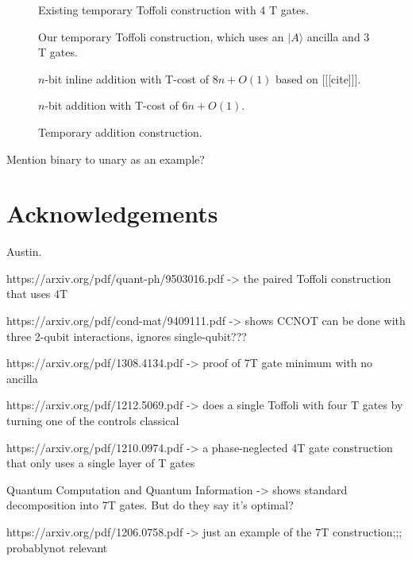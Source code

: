 \documentclass[twocolumn,longbibliography]{quantumarticle-customized}
\begin{document}
\begin{figure}
  \centering
  \makebox[\linewidth]{
  }
  \caption{
	Existing temporary Toffoli construction with 4 T gates.
  }
  \label{fig:inline-temporary-toffoli}
\end{figure}

\begin{figure}
  \centering
  \makebox[\linewidth]{
  }
  \caption{
	Our temporary Toffoli construction, which uses an $|A\rangle$ ancilla and 3 T gates.
  }
  \label{fig:ancilla-temporary-toffoli}
\end{figure}

\begin{figure}
  \centering
  \makebox[\linewidth]{
  }
  \caption{
	$n$-bit inline addition with T-cost of $8n + O(1)$ based on [[[cite]]].
  }
  \label{fig:inline-addition}
\end{figure}

\begin{figure}
  \centering
  \makebox[\linewidth]{
  }
  \caption{
	$n$-bit addition with T-cost of $6n + O(1)$.
  }
  \label{fig:ancilla-addition}
\end{figure}

\begin{figure}
  \centering
  \makebox[\linewidth]{
  }
  \caption{
	Temporary addition construction.
  }
  \label{fig:temporary-ancilla-addition}
\end{figure}

Mention binary to unary as an example?





\section{Acknowledgements}

Austin.





\cite{barenco1995}
https://arxiv.org/pdf/quant-ph/9503016.pdf   ->   the paired Toffoli construction that uses 4T

https://arxiv.org/pdf/cond-mat/9409111.pdf   -> shows CCNOT can be done with three 2-qubit interactions, ignores single-qubit???


https://arxiv.org/pdf/1308.4134.pdf -> proof of 7T gate minimum with no ancilla

https://arxiv.org/pdf/1212.5069.pdf  ->   does a single Toffoli with four T gates by turning one of the controls classical

https://arxiv.org/pdf/1210.0974.pdf  ->   a phase-neglected 4T gate construction that only uses a single layer of T gates


Quantum Computation and Quantum Information -> shows standard decomposition into 7T gates. But do they say it's optimal?

https://arxiv.org/pdf/1206.0758.pdf -> just an example of the 7T construction;;; probablynot relevant
\end{document}
